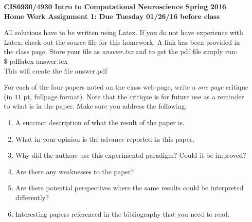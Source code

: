 \documentclass[11pt]{article}
\begin{document}
\begin{center}
{\large {\bf CIS6930/4930 Intro to Computational Neuroscience Spring 2016}}\\
{\normalsize {\bf Home Work Assignment 1: Due Tuesday 01/26/16 before class}}
\end{center}

All solutions have to be written using Latex. If you do not have experience
with Latex, check out the source file for this homework. A link has been
provided in the class page. Store your file as {\em answer.tex} and to get
the pdf file simply run:\\
\$ pdflatex answer.tex\\
This will create the file answer.pdf

For each of the four papers noted on the class web-page, write a {\em one page}
critique (in $11$ pt, fullpage format). Note that the critique is for future
use as a reminder to what is in the paper. Make sure you address the following.

\begin{enumerate}
\item A succinct description of what the result of the paper is.
\item What in your opinion is the advance reported in this paper.
\item Why did the authors use this experimental paradigm? Could it be improved?
\item Are there any weaknesses to the paper?
\item Are there potential perspectives where the same results could be
interpreted differently?
\item Interesting papers referenced in the bibliography that you need to read.
\end{enumerate}
\end{document}
